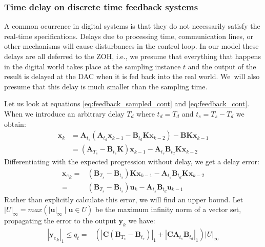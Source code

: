 \documentclass[sigconf]{llncs}
\newcommand{\mat}[1]{\boldsymbol{#1}}
\renewcommand{\vec}[1]{\boldsymbol{#1}}
\begin{document}
\subsubsection{Time delay on discrete time feedback systems} \label{sec:delay}

A common ocurrence in digital systems is that they do not necessarily
satisfy the real-time specifications.  Delays due to processing time,
communication lines, or other mechanisms will cause disturbances in the
control loop.  In our model these delays are all deferred to the ZOH, i.e.,
we presume that everything that happens in the digital world takes place at
the sampling instance $t$ and the output of the result is delayed at the DAC
when it is fed back into the real world.  We~will also presume that this
delay is much smaller than the sampling time.

Let us look at equations \eqref{eq:feedback_sampled_cont} and
\eqref{eq:feedback_cont}.  When we introduce an arbitrary delay $T_d$ where
$t_d=T_d$ and $t_s=T_s-T_d$ we obtain:
%
\begin{align}
\vec{x}_{k} &=\mat{A}_{t_s}(\mat{A}_{t_d}\vec{x}_{k-1}-\mat{B}_{t_d}\mat{K}\vec{x}_{k-2})-\mat{B}\mat{K}\vec{x}_{k-1}\nonumber\\
&=  (\mat{A}_{T_s}-\mat{B}_{t_s}\mat{K})\vec{x}_{k-1}-\mat{A}_{t_s}\mat{B}_{t_d}\mat{K}\vec{x}_{k-2}
\label{eq:delay_cont}
\end{align}
%
Differentiating with the expected progression without delay, we get a delay
error:
%
\begin{align}
{\vec{x}_e}_{k}=&(\mat{B}_{T_s}-\mat{B}_{t_s})\mat{K}\vec{x}_{k-1}-\mat{A}_{t_s}\mat{B}_{t_d}\mat{K}\vec{x}_{k-2}\nonumber\\
=&(\mat{B}_{T_s}-\mat{B}_{t_s})\vec{u}_{k}-\mat{A}_{t_s}\mat{B}_{t_d}\vec{u}_{k-1}
\end{align}
Rather than explicitly calculate this error, we will find an upper bound. Let $|U|_\infty=max(|\vec{u}|_\infty \mid \vec{u} \in U)$ be the maximum infinity norm of a vector set, propagating the error to the output $\vec{y}_k$ we have:
\begin{align}
|{\vec{y}_e}_{k}|_1 \leq q_t=&(|\mat{C}(\mat{B}_{T_s}-\mat{B}_{t_s})|_1+|\mat{C}\mat{A}_{t_s}\mat{B}_{t_d}|_1)|U|_\infty
\end{align}
\end{document}
